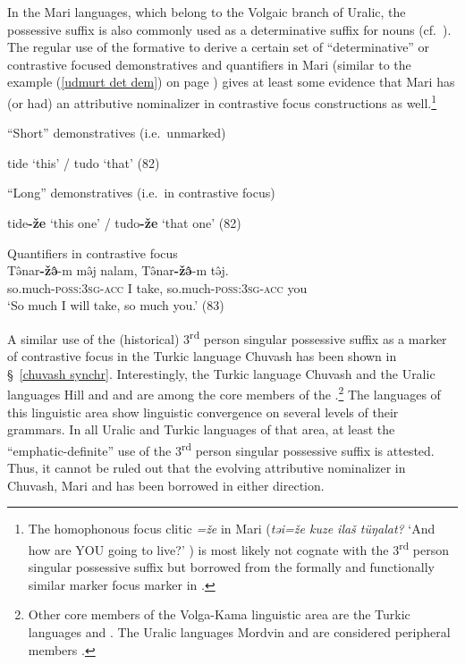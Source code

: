 In the Mari languages, which belong to the Volgaic branch of Uralic, the possessive suffix is also commonly used as a determinative suffix for nouns (cf.~\citealt[75–76]{alhoniemi1993}). The regular use of the formative to derive a certain set of “determinative” or contrastive focused demonstratives and quantifiers in Mari (similar to the  example (\ref{udmurt det dem}) on page \pageref{udmurt det dem}) gives at least some evidence that Mari has (or had) an attributive nominalizer in contrastive focus constructions as well.\footnote{The homophonous focus clitic \textit{=že} in Mari (\textit{təi=že kuze ilaš tüŋalat?} ‘And how are YOU going to live?’ \citealt[80]{alhoniemi1993}) is most likely not cognate with the 3\textsuperscript{rd} person singular possessive suffix but borrowed from the formally and functionally similar marker focus marker in .}%
\begin{exe}
\ex {}%
\begin{xlist}
\ex \rm{“Short” demonstratives (i.e.~unmarked)} 
\begin{xlist}
\ex tide \rm{‘this’ /} tudo \rm{‘that’ (82)}
\end{xlist}
\ex \rm{“Long” demonstratives (i.e.~in contrastive focus)}
\begin{xlist}
\ex tide\textbf{-že} \rm{‘this one’ /} tudo\textbf{-že} \rm{‘that one’ (82)}
\end{xlist}
\ex \rm{Quantifiers in contrastive focus}\\
\gll	Tə̂nar\textbf{-žə̂}-m mə̂j nalam, Tə̂nar\textbf{-žə̂}-m tə̂j.\\
	so.much-\textsc{poss:3sg}-\textsc{acc} I take, so.much-\textsc{poss:3sg}-\textsc{acc} you\\
\glt	‘So much I will take, so much you.’ (83)
\end{xlist}
\end{exe}
A similar use of the (historical) 3\textsuperscript{rd} person singular possessive suffix as a marker of contrastive focus in the Turkic language Chuvash has been shown in \S~\ref{chuvash synchr}. Interestingly, the Turkic language Chuvash and the Uralic languages Hill and  and  are among the core members of the .\footnote{Other core members of the Volga-Kama linguistic area are the Turkic languages  and . The Uralic languages Mordvin and  are considered peripheral members \citep{helimski2005}.} The languages of this linguistic area show linguistic convergence on several levels of their grammars. In all Uralic and Turkic languages of that area, at least the “emphatic-definite” use of the 3\textsuperscript{rd} person singular possessive suffix is attested. Thus, it cannot be ruled out that the evolving attributive nominalizer in Chuvash, Mari and  has been borrowed in either direction.%

